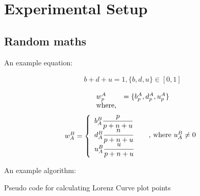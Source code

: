 
\chapter{Experimental Setup}

\label{chap:exp}

\section{Random maths}
An example equation: 

\begin{equation}
    \label{eq:OpinionTriangle}
    \begin{aligned}
        b+d+u=1, \{b,d,u\}\in[0,1]
    \end{aligned}
\end{equation}

\begin{equation}
    \label{eq:OpinionGeneral}
    \begin{array}{l l}
    w_p^{A} & =\{b_p^A,d_p^A,u_p^A\} \\
    \text{where,}
    \end{array}
\end{equation}
\begin{equation}
    \label{eq:OpinionCalc}
     w_A^B = \left\{
    \begin{array}{l l}
        b_A^B \dfrac{p}{p+n+u} & \quad \\
        d_A^B \dfrac{n}{p+n+u} & \quad \text{, where } u_A^B \neq  0\\
        u_A^B \dfrac{u}{p+n+u} &
    \end{array} \right.
\end{equation}

An example algorithm: 
\begin{algorithm}
    \label{alg:Lorenz}
	\caption{Pseudo code for calculating Lorenz Curve plot points}
\end{algorithm}


